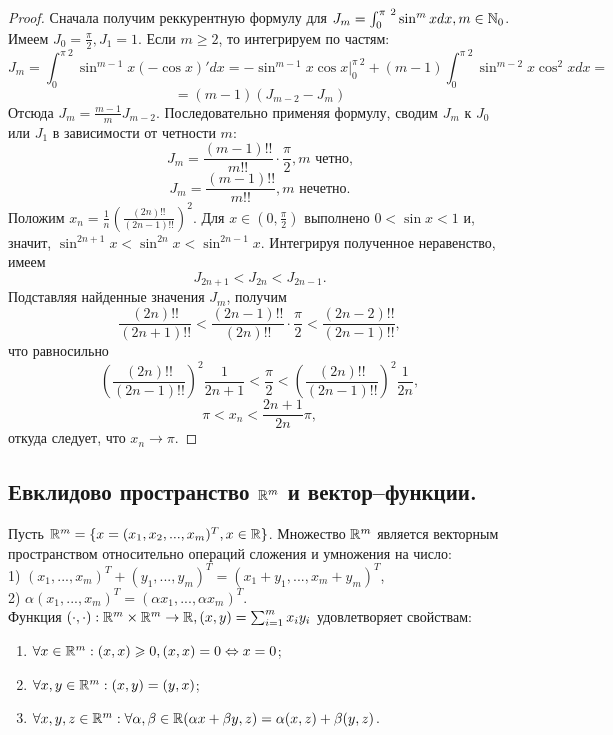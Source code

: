 \begin{proof}
    Сначала получим реккурентную формулу для $J_{m} = \int_{0}^{\pi \ 2}\sin^{m}x dx, m \in \mathbb{N}_{0}$. Имеем $J_{0} = \frac{\pi}{2}, J_{1} = 1$. Если $m \geq 2$, то интегрируем по частям:
    \[J_{m} = \int_{0}^{\pi \ 2}\sin^{m-1} x (-\cos x)'dx = -\sin^{m-1}x \cos x |_{0}^{\pi \ 2} + (m-1) \int_{0}^{\pi \ 2} \sin^{m-2} x \cos^{2} x dx =\]
    \[= (m-1)(J_{m-2} - J_{m})\]
    Отсюда $J_{m} = \frac{m-1}{m} J_{m-2}$. Последовательно применяя формулу, сводим $J_{m}$ к $J_{0}$ или $J_{1}$ в зависимости от четности $m$:
    \[J_{m} = \frac{(m-1)!!}{m!!} \cdot \frac{\pi}{2}, m \text{ четно,}\]
    \[J_{m} = \frac{(m-1)!!}{m!!}, m \text{ нечетно.}\]
    Положим $x_{n} = \frac{1}{n}(\frac{(2n)!!}{(2n-1)!!})^{2}$. Для $x \in (0, \frac{\pi}{2})$ выполнено $0 < \sin x < 1$ и, значит, $\sin^{2n+1}x < \sin^{2n}x < \sin^{2n - 1}x$. Интегрируя полученное неравенство, имеем
    \[J_{2n+1} < J_{2n} < J_{2n-1}.\]
    Подставляя найденные значения $J_{m}$, получим
    \[\frac{(2n)!!}{(2n+1)!!} < \frac{(2n-1)!!}{(2n)!!}\cdot \frac{\pi}{2} < \frac{(2n - 2)!!}{(2n - 1)!!},\]
    что равносильно
    \[(\frac{(2n)!!}{(2n-1)!!})^{2} \frac{1}{2n+1} < \frac{\pi}{2} < (\frac{(2n)!!}{(2n-1)!!})^{2} \frac{1}{2n},\]
    \[\pi < x_{n} < \frac{2n + 1}{2n}\pi,\]
    откуда следует, что $x_{n} \to \pi$.
\end{proof}

\subsection{Евклидово пространство $\mathbb{R}^{m}$ и вектор--функции.}

Пусть $\mathbb{R}^{m} = \{x = (x_{1}, x_{2}, ... , x_{m})^{T}, x \in \mathbb{R}\}$. Множество $\mathbb{R}^m$ является векторным пространством относительно операций сложения и умножения на число:\\
1) $(x_{1}, ... , x_{m})^{T} + (y_{1}, ... , y_{m})^{T} = (x_{1} + y_{1}, ... , x_{m} + y_{m})^{T}$,\\
2) $\alpha (x_{1}, ... , x_{m})^{T} = (\alpha x_{1}, ... , \alpha x_{m})^{T}$.\\
Функция $(\cdot, \cdot): \mathbb{R}^{m} \times \mathbb{R}^{m} \to \mathbb{R}, (x, y) = \sum_{i = 1}^{m}x_{i}y_{i}$ удовлетворяет свойствам:
\begin{enumerate}
    \item $\forall x \in \mathbb{R}^{m}: (x, x) \geqslant 0, (x, x) = 0 \Leftrightarrow x = 0$;
    \item $\forall x, y \in \mathbb{R}^{m}: (x, y) = (y, x)$;
    \item $\forall x, y, z \in \mathbb{R}^{m}: \forall \alpha, \beta \in \mathbb{R} (\alpha x + \beta y, z) = \alpha(x, z) + \beta(y, z)$.
\end{enumerate}


